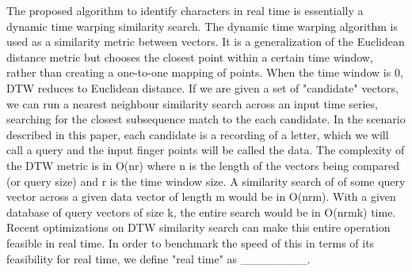The proposed algorithm to identify characters in real time is essentially a dynamic time warping similarity search. 
The dynamic time warping algorithm is used as a similarity metric between vectors. It is a generalization of the Euclidean distance metric but chooses the closest point within a certain time window, rather than creating a one-to-one mapping of points. When the time window is 0, DTW reduces to Euclidean distance.
If we are given a set of "candidate" vectors, we can run a nearest neighbour similarity search across an input time series, searching for the closest subsequence match to the each candidate. In the scenario described in this paper, each candidate is a recording of a letter, which we will call a query and the input finger points will be called the data.
The complexity of the DTW metric is in O(nr) where n is the length of the vectors being compared (or query size) and r is the time window size. A similarity search of of some query vector across a given data vector of length m would be in O(nrm). With a given database of query vectors of size k, the entire search would be in O(nrmk) time.
Recent optimizations on DTW similarity search can make this entire operation feasible in real time. In order to benchmark the speed of this in terms of its feasibility for real time, we define "real time" as ________.
